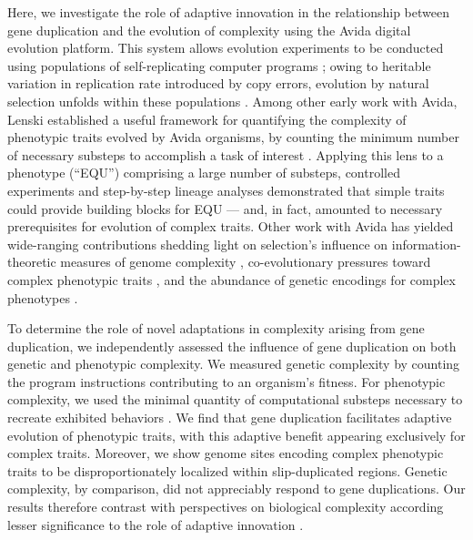 

Here, we investigate the role of adaptive innovation in the relationship between gene duplication and the evolution of complexity using the Avida digital evolution platform.
This system allows evolution experiments to be conducted using populations of self-replicating computer programs \citep{Ofria:2009avida};
owing to heritable variation in replication rate introduced by copy errors, evolution by natural selection unfolds within these populations \citep{pennock2007models}.
Among other early work with Avida, Lenski established a useful framework for quantifying the complexity of phenotypic traits evolved by Avida organisms, by counting the minimum number of necessary substeps to accomplish a task of interest \citet{lenski2003evolutionary}.
Applying this lens to a phenotype  (``EQU'') comprising a large number of substeps, controlled experiments and step-by-step lineage analyses demonstrated that simple traits could provide building blocks for EQU --- and, in fact, amounted to necessary prerequisites for evolution of complex traits.
Other work with Avida has yielded wide-ranging contributions shedding light on selection's influence on information-theoretic measures of genome complexity \citep{Adami2000Evolution}, co-evolutionary pressures toward complex phenotypic traits \citep{Zaman2014Coevolution}, and the abundance of genetic encodings for complex phenotypes \citep{Fortuna2017GenotypePhenotype}.

To determine the role of novel adaptations in complexity arising from gene duplication, we independently assessed the influence of gene duplication on both genetic and phenotypic complexity.
We measured genetic complexity by counting the program instructions contributing to an organism's fitness.
For phenotypic complexity, we used the minimal quantity of computational substeps necessary to recreate exhibited behaviors \citet{lenski2003evolutionary}.
We find that gene duplication facilitates adaptive evolution of phenotypic traits, with this adaptive benefit appearing exclusively for complex traits.
Moreover, we show genome sites encoding complex phenotypic traits to be disproportionately localized within slip-duplicated regions.
Genetic complexity, by comparison, did not appreciably respond to gene duplications.
Our results therefore contrast with perspectives on biological complexity according lesser significance to the role of adaptive innovation \citep{Lynch2000,Beslon2021,Lynch2007}.

